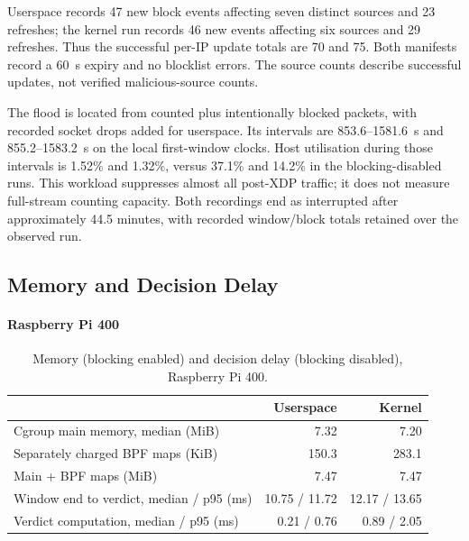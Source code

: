 Userspace records 47 new block events affecting seven distinct sources and
23 refreshes; the kernel run records 46 new events affecting six sources
and 29 refreshes. Thus the successful per-IP update totals are 70 and 75.
Both manifests record a 60~s expiry and no blocklist errors. The source
counts describe successful updates, not verified malicious-source counts.

The flood is located from counted plus intentionally blocked packets,
with recorded socket drops added for userspace. Its intervals are
853.6--1581.6~s and 855.2--1583.2~s on the local first-window clocks.
Host utilisation during those intervals is 1.52\% and 1.32\%, versus
37.1\% and 14.2\% in the blocking-disabled runs. This workload suppresses
almost all post-XDP traffic; it does not measure full-stream counting
capacity. Both recordings end as interrupted after approximately 44.5
minutes, with recorded window/block totals retained over the observed run.


\subsection{Memory and Decision Delay}
\label{sec:res-other}

\paragraph{Raspberry Pi 400}

\begin{table}[H]
  \centering
  \small
  \begin{tabular}{lrr}
    \toprule
    & Userspace & Kernel \\
    \midrule
    Cgroup main memory, median (MiB)     & 7.32  & 7.20 \\
    Separately charged BPF maps (KiB)    & 150.3 & 283.1 \\
    Main + BPF maps (MiB)                & 7.47  & 7.47 \\
    \midrule
    Window end to verdict, median / p95 (ms) & 10.75 / 11.72 & 12.17 / 13.65 \\
    Verdict computation, median / p95 (ms)   & 0.21 / 0.76   & 0.89 / 2.05 \\
    \bottomrule
  \end{tabular}
  \caption{Memory (blocking enabled) and decision delay (blocking disabled),
  Raspberry Pi 400.}
  \label{tab:other}
\end{table}

